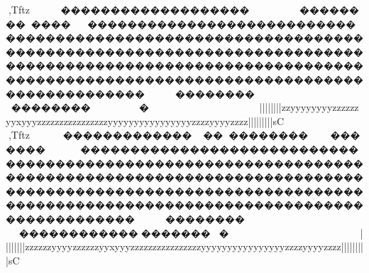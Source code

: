 {{{{{{{{{{{{{{{{{{{{{{{{{{{{{{{{{{{{{{{{{{{{{{{{{{{{{{{{{{{{{{{{{{{{{{{{{{{{{{{{{{{{{{{{{{{{{{{{{{{{{{{{{{{{{{{{{{{{{{{{{{{{{{{{{{{{{{{{{{{{{{{{{{{{{{{{{{{{{{{{{{{{{{{{{{{{{{{{{{{{{{{{{{{{{{{{{{{{{{{{{{{{{{{{{{{{{{{{{{{{{{{{{{{{{{{{{{{{{{{{{{{{{{{{{{{{{{{{{{{{{{{{{{{{{{{{{{{{{{{{{{{{{{{{{{{{{{{{{{{{{{{{{{{{{{{{{{{{{{{{{{{{{{{{{{{{{{{{{{{{{{{{{{{{{{{{{{{{{{{{{{{{{{{{{{{{{{{{{{{{{{{{{{{{{{{{{{{{{{{{{{{{{{{{{{{{{{{{{{{{{{{{{{{{{{{{{{{{{{{{{{{{{{{{{{{{{{{{{{{{{{{{{{{{{{{{{{{{{{{{{{{{{{{{{{{{{{{{{{{{{{{{{{{{{{{{{{{{{{{{{{{{{{{{{{{{{{{{{{{{{{{{{{{{{{{{{{{{{{{{{{{{{{{{{{{{{{{{{{{{{{{{{{{{{{{{{{{{{{{{{{{{{{{{{{{{{{{{{{{{{{{{{{{{{{{{{{{{{{{{{{{{{{{{{{{{{{{{{{{{{{{{{{{{{{{{{{{{{{{{{{{{{{{{{{{{{{{{{{{{{{{{{{{{{{{{{{{{{{{{{{{{{{{{{{{{{{{{{{{{{{{{{{{{{{{{{{{{{{{{{{{{{{{{{{{{{{{{{{{{{{{{{{{{{{{{{{{{{{{{{{{{{{{{{{{{{{{{{{{{{{{{{{{{{{{{{{{{{{{{{{{{{{{{{{{{{{{{{{{{{{{{{{{{{{{{{{{{{{{{{{{{{{{{{{{{{{{{{{{{{{{{{{{{{{{{{{{{{{{{{{{{{{{{{{{{{{{{{{{{{{{{{{{{{{{{{{{{{{{{{{{{{{{{{{{{{{{{{{{{{{{{{{{{{{{{{{{{{{{{{{{{{{{{{{{{{{{{{{{{{{{{{{{{{{{{{{{{{{{{{{{{{{{{{{{{{{{{{{{{{{{{{{{{{{{{{{{{{{{{{{{{,Tftz~~~~��������������������������������������������������������������������������������������������������������������������������������������������������������������������������������������������������������������������������������~��������~~~�~~~~~~~~~~~~~~~~~~~~}}}}}}|||||}}}}|||{{{{{{{{zzyyyyyyyyzzzzzzyyxyyyzzzzzzzzzzzzzzzzyyyyyyyyyyyyyyyyzzzzyyyyzzzz{{{{|||||||||sC
,Tftz~~~~~������������������������������~~}}�������������������������������������������������������������������������������������������������������������������������������������������������������������������������������������������������~~~~~~~~��������������������~~~~~~~~~~~~~~~~~~~~~~|||||}}}}|||{{{{{{{{zzzzzzyyyyzzzzzzyyxyyyzzzzzzzzzzzzzzzzyyyyyyyyyyyyyyyyzzzzyyyyzzzz{{{{|||||||||sC
}}}}}}}}}}}}}}}}}}}}}}}}}}}}}}}}}}}}}}}}}}}}}}}}}}}}}}}}}}}}}}}}}}}}}}}}}}}}}}}}}}}}}}}}}}}}}}}}}}}}}}}}}}}}}}}}}}}}}}}}}}}}}}}}}}}}}}}}}}}}}}}}}}}}}}}}}}}}}}}}}}}}}}}}}}}}}}}}}}}}}}}}}}}}}}}}}}}}}}}}}}}}}}}}}}}}}}}}}}}}}}}}}}}}}}}}}}}}}}}}}}}}}}}}}}}}}}}}}}}}}}}}}}}}}}}}}}}}}}}}}}}}}}}}}}}}}}}}}}}}}}}}}}}}}}}}}}}}}}}}}}}}}}}}}}}}}}}}}}}}}}}}}}}}}}}}}}}}}}}}}}}}}}}}}}}}}}}}}}}}}}}}}}}}}}}}}}}}}}}}}}}}}}}}}}}}}}}}}}}}}}}}}}}}}}}}}}}}}}}}}}}}}}}}}}}}}}}}}}}}}}}}}}}}}}}}}}}}}}}}}}}}}}}}}}}}}}}}}}}}}}}}}}}}}}}}}}}}}}}}}}}}}}}}}}}}}}}}}}}}}}}}}}}}}}}}}}}}}}}}}}}}}}}}}}}}}}}}}}}}}}}}}}}}}}}}}}}}}}}}}}}}}}}}}}}}}}}}}}}}}}}}}}}}}}}}}}}}}}}}}}}}}}}}}}}}}}}}}}}}}}}}}}}}}}}}}}}}}}}}}}}}}}}}}}}}}}}}}}}}}}}}}}}}}}}}}}}}}}}}}}}}}}}}}}}}}}}}}}}}}}}}}}}}}}}}}}}}}}}}}}}}}}}}}}}}}}}}}}}}}}}}}}}}}}}}}}}}}}}}}}}}}}}}}}}}}}}}}}}}}}}}}}}}}}}}}}}}}}}}}}}}}}}}}}}}}}}}}}}}}}}}}}}}}}}}}}}}}}}}}}}}}}}}}}}}}}}}}}}}}}}}}}}}}}}}}}}}}}}}}}}}}}}}}}}}}}}}}}}}}}}}}}}}}}}}}}}}}}}}}}}}}}}}}}}}}}}}}}}}}}}}}}}}}}}}}}}}}}}}}}}}}}}}}}}}}}}}}}}}}}}}}}}}}}}}}}}}}}}}}}}}}}}}}}}}}}}}}}}}}}}}}}}}}}}}}}}}}}}}}}}}}}}}}}}}
